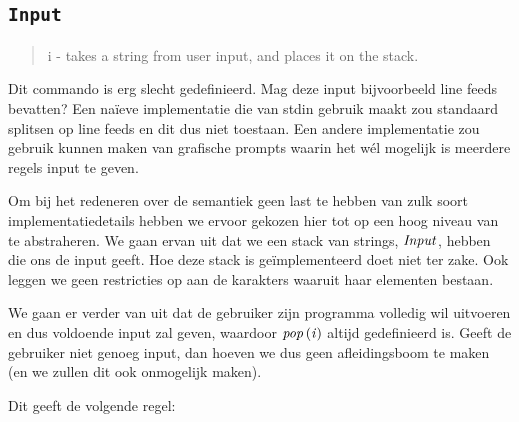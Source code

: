\subsection{\texttt{Input}}
\label{sec:rules:input}

\begin{quote}
	i - takes a string from user input, and places it on the stack.
\end{quote}

Dit commando is erg slecht gedefinieerd. Mag deze input bijvoorbeeld line feeds
bevatten? Een naïeve implementatie die van stdin gebruik maakt zou standaard
splitsen op line feeds en dit dus niet toestaan.  Een andere implementatie zou
gebruik kunnen maken van grafische prompts waarin het wél mogelijk is meerdere
regels input te geven.

Om bij het redeneren over de semantiek geen last te hebben van zulk soort
implementatiedetails hebben we ervoor gekozen hier tot op een hoog niveau van
te abstraheren. We gaan ervan uit dat we een stack van strings, $\mathit{Input}$,
hebben die ons de input geeft. Hoe deze stack is geïmplementeerd doet niet ter
zake. Ook leggen we geen restricties op aan de karakters waaruit haar elementen
bestaan.

We gaan er verder van uit dat de gebruiker zijn programma volledig wil
uitvoeren en dus voldoende input zal geven, waardoor $\mathit{pop}\left(\mathit{i}\right)$ altijd
gedefinieerd is. Geeft de gebruiker niet genoeg input, dan hoeven we dus geen
afleidingsboom te maken (en we zullen dit ook onmogelijk maken).

Dit geeft de volgende regel:
\therinputns%
